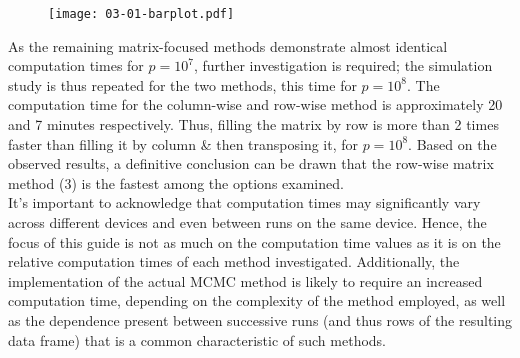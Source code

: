 \documentclass[a4paper]{article}
\begin{document}
\begin{figure}[H]
\caption{}
\centering
\label{fig1}
\texttt{[image: 03-01-barplot.pdf]}
\end{figure}

\noindent As the remaining matrix-focused methods demonstrate almost identical computation times for $p = 10^7$, further investigation is required; the simulation study is thus repeated for the two methods, this time for $p = 10^8$. The computation time for the column-wise and row-wise method is approximately 20 and 7 minutes respectively. Thus, filling the matrix by row is more than 2 times faster than filling it by column \& then transposing it, for $p = 10^8$. Based on the observed results, a definitive conclusion can be drawn that the row-wise matrix method (3) is the fastest among the options examined.\\

\noindent It's important to acknowledge that computation times may significantly vary across different devices and even between runs on the same device. Hence, the focus of this guide is not as much on the computation time values as it is on the relative computation times of each method investigated. Additionally, the implementation of the actual MCMC method is likely to require an increased computation time, depending on the complexity of the method employed, as well as the dependence present between successive runs (and thus rows of the resulting data frame) that is a common characteristic of such methods.\\
\end{document}
